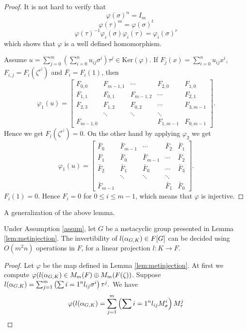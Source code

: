 \begin{proof}
It is not hard to verify that 
$$\varphi(\sigma)^n = I_m$$
$$\varphi(\tau)^m = \varphi(\sigma)^t$$
$$\varphi(\tau)^{-1}\varphi_i(\sigma) \varphi_i(\tau) = \varphi_i(\sigma)^r$$
which shows that $\varphi$ is a well defined homomorphism. 

Assume $u = \sum_{j = 0}^m \left( \sum_{i = 0}^n u_{ij} \sigma^i \right) \tau^j \in \mathrm{Ker}(\varphi).$ If
$F_j(x) = \sum_{i = 0}^n u_{ij}x^i$, $F_{i,j} = F_i(\zeta^{r^j})$ and $\bar{F_i} = F_i(1)$, then 
$$\varphi_1(u) = 
\left[\begin{array}{lllll}
F_{0,0} & F_{m-1,1}	& \cdots	&	F_{2,0} & F_{1,0}\\
F_{1,1} & F_{0,1}& F_{m-1,2} &\cdots & F_{2,1}\\
F_{2,3} & F_{1,2}& F_{0,2} &\cdots & F_{3,m-1}\\
&\ddots & \ddots & \ddots&\\
F_{m-1,0}	&	&	& F_{1,m-1}	& F_{0,m-1}
\end{array}
\right].
$$
Hence we get $F_i(\zeta^{r^j}) =0$. On the other hand by applying $\varphi_2$ we get
$$\varphi_1(u) = 
\left[\begin{array}{lllll}
\bar{F}_{0} & \bar{F}_{m-1}	& \cdots	&	\bar{F}_{2} & \bar{F}_{1}\\
\bar{F}_{1} & \bar{F}_{0}& \bar{F}_{m-1} &\cdots & \bar{F}_{2}\\
\bar{F}_{2} & \bar{F}_{1}& \bar{F}_{0} &\cdots & \bar{F}_{3}\\
&\ddots & \ddots & \ddots&\\
\bar{F}_{m-1}	&	&	& \bar{F}_{1}	& \bar{F}_{0}
\end{array}
\right].
$$
$F_i(1) = 0$. Hence
$F_i = 0$ for $0 \leq i \leq m-1$, which means that $\varphi$ is injective.
\end{proof}

A generalization of the above lemma. 

\begin{proposition}

\end{proposition}

\begin{proposition}
Under Assumption \ref{assum}, let $G$ be a metacyclic group presented in Lemma \ref{lem:metinjection}. The invertibility of $l(\alpha_{G,K}) \in F[G]$ can be decided using $O(m^2n)$ operations in $F$, for a linear projection $l: K\rightarrow F$.
\end{proposition}

\begin{proof}
Let $\varphi$ be the map defined in Lemma \ref{lem:metinjection}. At first we compute $\varphi(l(\alpha_{G,K}) \in M_m(F) \oplus M_m(F(\zeta))$. Suppose $l(\alpha_{G,K}) = \sum_{j = 1}^m\left( \sum{i = 1}^n l_{ij}\sigma^i \right)\tau^j.$ We have 
$$\varphi(l(\alpha_{G,K}) = \sum_{j = 1}^m\left( \sum{i = 1}^n l_{ij}M_{\sigma}^i \right)M_{\tau}^j$$
\end{proof}



